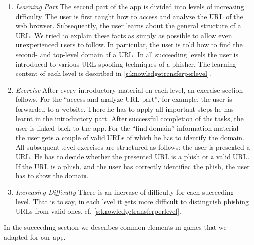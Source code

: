 \begin{enumerate}
\begin{enumerate}
	\item \textit{Learning Part} The second part of the app is divided into levels of increasing difficulty.
 The user is first taught how to access and analyze the URL of the web browser.
 Subsequently, the user learns about the general structure of a URL.
 We tried to explain these facts as simply as possible to allow even unexperienced users to follow.
 In particular, the user is told how to find the second- and top-level domain of a URL.
 In all succeeding levels the user is introduced to various URL spoofing techniques of a phisher.
 The learning content of each level is described in \autoref{s:knowledgetransferperlevel}.
		\item \textit{Exercise} After every introductory material on each level, an exercise section follows.
 For the ``access and analyze URL part'', for example, the user is forwarded to a website.
 There he has to apply all important steps he has learnt in the introductory part.
 After successful completion of the tasks, the user is linked back to the app.
 For the ``find domain'' information material the user gets a couple of valid URLs of which he has to identify the domain.
 All subsequent level exercises are structured as follows: the user is presented a URL.
 He has to decide whether the presented URL is a phish or a valid URL.
 If the URL is a phish, and the user has correctly identified the phish, the user has to show the domain.

		\item \textit{Increasing Difficulty} There is an increase of difficulty for each succeeding level.
 That is to say, in each level it gets more difficult to distinguish phishing URLs from valid ones, cf. \autoref{s:knowledgetransferperlevel}.
\end{enumerate}
\end{enumerate}

In the succeeding section we describes common elements in games that we adapted for our app.

